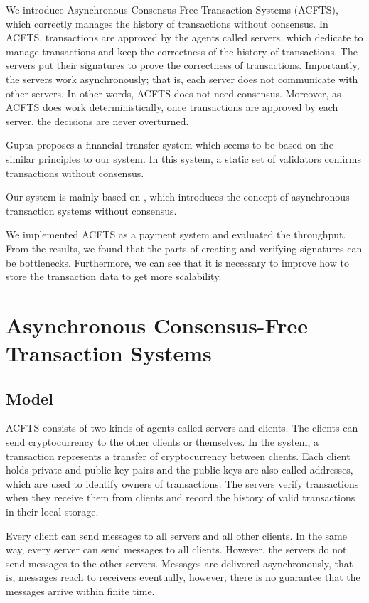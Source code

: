 \documentclass[a4paper, oneside]{discothesis}
\begin{document}
We introduce Asynchronous Consensus-Free Transaction Systems (ACFTS),
which correctly manages the history of transactions without consensus.
In ACFTS, transactions are approved by the agents called servers,
which dedicate to manage transactions and keep the correctness of the history of transactions.
The servers put their signatures to prove the correctness of transactions.
Importantly, the servers work asynchronously; that is, each server does not communicate
with other servers.
In other words, ACFTS does not need consensus.
Moreover, as ACFTS does work deterministically, once transactions are approved by each server,
the decisions are never overturned.

Gupta \cite{gupta} proposes a financial transfer system which seems to be based
on the similar principles to our system.
In this system, a static set of validators confirms transactions without consensus.

Our system is mainly based on \cite{abc}, which introduces the concept of asynchronous transaction systems without consensus.

We implemented ACFTS as a payment system and evaluated the throughput.
From the results, we found that the parts of creating and verifying signatures
can be bottlenecks.
Furthermore, we can see that it is necessary to improve how to store the transaction data
to get more scalability.

\chapter{Asynchronous Consensus-Free Transaction Systems}

\section{Model}
ACFTS consists of two kinds of agents called servers and clients.
The clients can send cryptocurrency to the other clients or themselves.
In the system, a transaction represents a transfer of cryptocurrency between clients.
Each client holds private and public key pairs
and the public keys are also called addresses, which are used to identify owners of transactions.
The servers verify transactions when they receive them from clients
and record the history of valid transactions in their local storage.

Every client can send messages to all servers and all other clients.
In the same way, every server can send messages to all clients.
However, the servers do not send messages to the other servers.
Messages are delivered asynchronously, that is, messages reach to receivers eventually,
however, there is no guarantee that the messages arrive within finite time.
\end{document}
